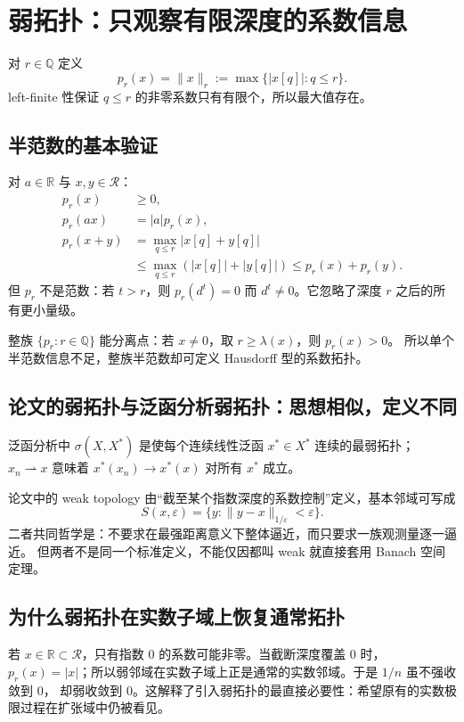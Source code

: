 \documentclass[11pt,a4paper]{article}
\theoremstyle{remark}
\newcommand{\LC}{\mathcal R}
\newcommand{\R}{\mathbb R}
\newcommand{\Q}{\mathbb Q}
\begin{document}
\section{弱拓扑：只观察有限深度的系数信息}

对 $r\in\Q$ 定义
\[
p_r(x)=\|x\|_r:=\max\{|x[q]|:q\le r\}.
\]
left-finite 性保证 $q\le r$ 的非零系数只有有限个，所以最大值存在。

\subsection{半范数的基本验证}

对 $a\in\R$ 与 $x,y\in\LC$：
\[
\begin{aligned}
p_r(x)&\ge0,\\
p_r(ax)&=|a|p_r(x),\\
p_r(x+y)&=\max_{q\le r}|x[q]+y[q]|\\
&\le\max_{q\le r}(|x[q]|+|y[q]|)\le p_r(x)+p_r(y).
\end{aligned}
\]
但 $p_r$ 不是范数：若 $t>r$，则 $p_r(d^t)=0$ 而 $d^t\ne0$。它忽略了深度 $r$
之后的所有更小量级。

整族 $\{p_r:r\in\Q\}$ 能分离点：若 $x\ne0$，取 $r\ge\lambda(x)$，则 $p_r(x)>0$。
所以单个半范数信息不足，整族半范数却可定义 Hausdorff 型的系数拓扑。

\subsection{论文的弱拓扑与泛函分析弱拓扑：思想相似，定义不同}

泛函分析中 $\sigma(X,X^*)$ 是使每个连续线性泛函 $x^*\in X^*$ 连续的最弱拓扑；
$x_n\rightharpoonup x$ 意味着 $x^*(x_n)\to x^*(x)$ 对所有 $x^*$ 成立。

论文中的 weak topology 由“截至某个指数深度的系数控制”定义，基本邻域可写成
\[
S(x,\varepsilon)=\{y:\|y-x\|_{1/\varepsilon}<\varepsilon\}.
\]
二者共同哲学是：不要求在最强距离意义下整体逼近，而只要求一族观测量逐一逼近。
但两者不是同一个标准定义，不能仅因都叫 weak 就直接套用 Banach 空间定理。

\subsection{为什么弱拓扑在实数子域上恢复通常拓扑}

若 $x\in\R\subset\LC$，只有指数 $0$ 的系数可能非零。当截断深度覆盖 $0$ 时，
$p_r(x)=|x|$；所以弱邻域在实数子域上正是通常的实数邻域。于是 $1/n$ 虽不强收敛到 $0$，
却弱收敛到 $0$。这解释了引入弱拓扑的最直接必要性：希望原有的实数极限过程在扩张域中仍被看见。
\end{document}
